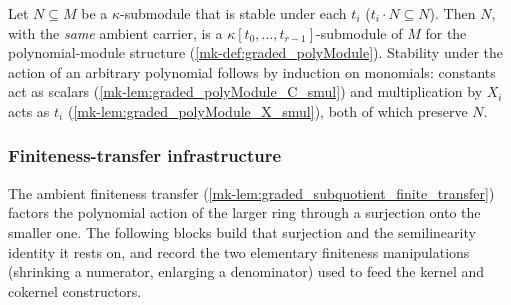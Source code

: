 \begin{definition}\label{mk-def:graded_polySubmodule}
  \leanok

  Let \(N \subseteq M\) be a \(\kappa\)-submodule that is stable under each \(t_i\)
  (\(t_i \cdot N \subseteq N\)). Then \(N\), with the \emph{same} ambient carrier, is a
  \(\kappa[t_0, \dots, t_{r-1}]\)-submodule of \(M\) for the polynomial-module structure
  (\ref{mk-def:graded_polyModule}). Stability under the action of an arbitrary polynomial
  follows by induction on monomials: constants act as scalars
  (\ref{mk-lem:graded_polyModule_C_smul}) and multiplication by \(X_i\) acts as \(t_i\)
  (\ref{mk-lem:graded_polyModule_X_smul}), both of which preserve \(N\).
\end{definition}


\subsubsection*{Finiteness-transfer infrastructure}

The ambient finiteness transfer (\ref{mk-lem:graded_subquotient_finite_transfer})
factors the polynomial action of the larger ring through a surjection onto the
smaller one. The following blocks build that surjection and the semilinearity
identity it rests on, and record the two elementary finiteness manipulations
(shrinking a numerator, enlarging a denominator) used to feed the kernel and
cokernel constructors.

